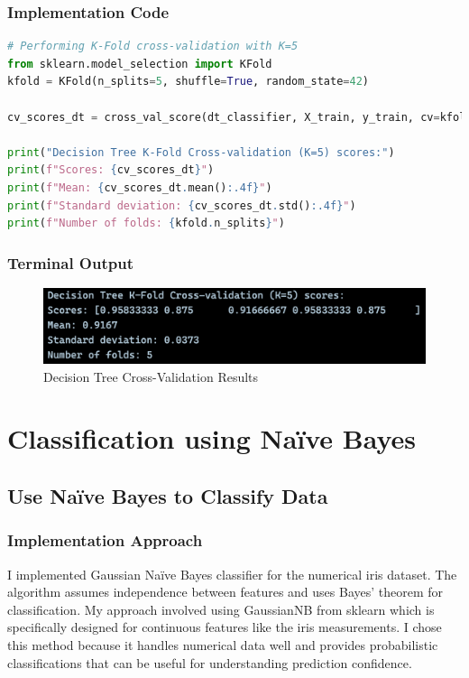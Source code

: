 \documentclass[12pt,a4paper]{article}
\begin{document}
\subsubsection{Implementation Code}
\begin{lstlisting}[language=Python, caption=K-Fold Cross-Validation for Decision Tree]
# Performing K-Fold cross-validation with K=5
from sklearn.model_selection import KFold
kfold = KFold(n_splits=5, shuffle=True, random_state=42)

cv_scores_dt = cross_val_score(dt_classifier, X_train, y_train, cv=kfold)

print("Decision Tree K-Fold Cross-validation (K=5) scores:")
print(f"Scores: {cv_scores_dt}")
print(f"Mean: {cv_scores_dt.mean():.4f}")
print(f"Standard deviation: {cv_scores_dt.std():.4f}")
print(f"Number of folds: {kfold.n_splits}")
\end{lstlisting}

\subsubsection{Terminal Output}

\begin{figure}[h!]
\centering
     \includegraphics[width=\textwidth]{Figures/cross.png}
    \caption{Decision Tree Cross-Validation Results}
\end{figure}

\section{Classification using Na\"{i}ve Bayes}

\subsection{Use Na\"{i}ve Bayes to Classify Data}

\subsubsection{Implementation Approach}
I implemented Gaussian Na\"{i}ve Bayes classifier for the numerical iris dataset. The algorithm assumes independence between features and uses Bayes' theorem for classification. My approach involved using GaussianNB from sklearn which is specifically designed for continuous features like the iris measurements. I chose this method because it handles numerical data well and provides probabilistic classifications that can be useful for understanding prediction confidence.
\end{document}
